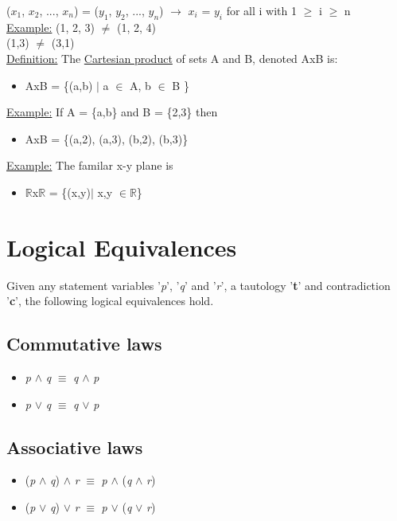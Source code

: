 \documentclass{article}
\begin{document}
($x_{1}$, $x_{2}$, ..., $x_{n}$) = ($y_{1}$, $y_{2}$, ..., $y_{n}$) $\rightarrow$ $x_{i}$ = $y_{i}$ for all i with 1 $\geq$ i $\geq$ 
n \\

\underline{Example:} (1, 2, 3) $\neq$ (1, 2, 4) \\
(1,3) $\neq$ (3,1) \\

\underline{Definition:} The \underline{Cartesian product} of sets A and B, denoted AxB is:
\begin{itemize}
\item AxB = \{(a,b) $|$ a $\in$ A, b $\in$ B \}
\end{itemize}

\underline{Example:} If A = \{a,b\} and B = \{2,3\} then
\begin{itemize}
\item AxB = \{(a,2), (a,3), (b,2), (b,3)\}
\end{itemize}

\underline{Example:} The familar x-y plane is
\begin{itemize}
\item $\mathbb{R}$x$\mathbb{R}$ = \{(x,y)$|$ x,y $\in \mathbb{R}$\}
\end{itemize}

\section{Logical Equivalences}

Given any statement variables '\textit{p}', '\textit{q}' and '\textit{r}', a tautology '\textbf{t}' and contradiction '\textbf{c}', the following
logical equivalences hold.


\subsection{Commutative laws}
\begin{itemize} 
\item \textit{p} $\wedge$ \textit{q} $\equiv$ \textit{q} $\wedge$ \textit{p}
\item \textit{p} $\lor$ \textit{q} $\equiv$ \textit{q} $\lor$ \textit{p}
\end{itemize}

\subsection{Associative laws}
\begin{itemize}
\item (\textit{p} $\wedge$ \textit{q}) $\wedge$ \textit{r} $\equiv$ \textit{p} $\wedge$ (\textit{q} $\wedge$ \textit{r})
\item (\textit{p} $\lor$ \textit{q}) $\lor$ \textit{r} $\equiv$ \textit{p} $\lor$ (\textit{q} $\lor$ \textit{r})
\end{itemize}
\end{document}
